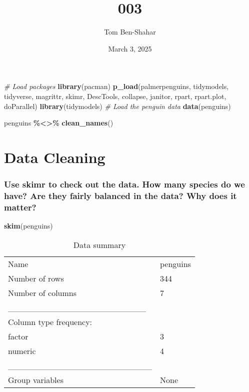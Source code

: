 \documentclass[
]{article}
\title{003}
\author{Tom Ben-Shahar}
\date{March 3, 2025}
\newenvironment{Shaded}{\begin{snugshade}}{\end{snugshade}}
\newcommand{\CommentTok}[1]{\textcolor[rgb]{0.56,0.35,0.01}{\textit{#1}}}
\newcommand{\FunctionTok}[1]{\textcolor[rgb]{0.13,0.29,0.53}{\textbf{#1}}}
\newcommand{\NormalTok}[1]{#1}
\newcommand{\SpecialCharTok}[1]{\textcolor[rgb]{0.81,0.36,0.00}{\textbf{#1}}}
\newcommand{\StringTok}[1]{\textcolor[rgb]{0.31,0.60,0.02}{#1}}
\begin{document}
\maketitle

\begin{Shaded}
\begin{Highlighting}[]
\CommentTok{\# Load packages}
\FunctionTok{library}\NormalTok{(pacman)}
\FunctionTok{p\_load}\NormalTok{(palmerpenguins, tidymodels, tidyverse, magrittr, skimr, DescTools, collapse, janitor, rpart, rpart.plot, doParallel)}
\FunctionTok{library}\NormalTok{(tidymodels)}
\CommentTok{\# Load the penguin data}
\FunctionTok{data}\NormalTok{(}\StringTok{\textquotesingle{}penguins\textquotesingle{}}\NormalTok{)}

\NormalTok{penguins }\SpecialCharTok{\%\textless{}\textgreater{}\%} \FunctionTok{clean\_names}\NormalTok{()}
\end{Highlighting}
\end{Shaded}

\section{Data Cleaning}\label{data-cleaning}

\subsubsection{Use skimr to check out the data. How many species do we
have? Are they fairly balanced in the data? Why does it
matter?}\label{use-skimr-to-check-out-the-data.-how-many-species-do-we-have-are-they-fairly-balanced-in-the-data-why-does-it-matter}

\begin{Shaded}
\begin{Highlighting}[]
\FunctionTok{skim}\NormalTok{(penguins)}
\end{Highlighting}
\end{Shaded}

\begin{longtable}[]{@{}ll@{}}
\caption{Data summary}\tabularnewline
\toprule\noalign{}
\endfirsthead
\endhead
\bottomrule\noalign{}
\endlastfoot
Name & penguins \\
Number of rows & 344 \\
Number of columns & 7 \\
\_\_\_\_\_\_\_\_\_\_\_\_\_\_\_\_\_\_\_\_\_\_\_ & \\
Column type frequency: & \\
factor & 3 \\
numeric & 4 \\
\_\_\_\_\_\_\_\_\_\_\_\_\_\_\_\_\_\_\_\_\_\_\_\_ & \\
Group variables & None \\
\end{longtable}
\end{document}
